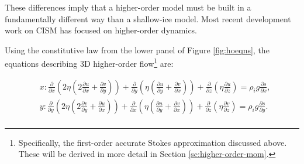 These differences imply that a higher-order model must be built in a fundamentally different way than a shallow-ice model.
Most recent development work on CISM has focused on higher-order dynamics.

%
%
%

Using the constitutive law from the lower panel of Figure \ref{fig:hoeqns}, the equations describing 3D higher-order flow\footnote{Specifically, the first-order accurate Stokes approximation discussed above. These will be derived in more detail in Section \ref{sc:higher-order-mom}.} are:

\begin{equation}
  \begin{split}
  & x: \frac{\partial}{\partial x}\left ( 2 \eta  
\left(2\frac{\partial u}{\partial x}+\frac{\partial v}{\partial y}\right)\right)
+\frac{\partial}{\partial y}\left(\eta \left(
\frac{\partial u}{\partial y}+\frac{\partial v}{\partial x}\right)\right)
+\frac{\partial}{\partial z}\left(\eta \frac{\partial u}{\partial z}\right)
=\rho_i g \frac{\partial s}{\partial x}, \\
  & y: \frac{\partial}{\partial y}\left ( 2 \eta 
\left(2\frac{\partial v}{\partial y}+\frac{\partial u}{\partial x}\right)\right)
+\frac{\partial}{\partial x}\left(\eta \left(
\frac{\partial u}{\partial y}+\frac{\partial v}{\partial x}\right)\right)
+\frac{\partial}{\partial z}\left(\eta \frac{\partial v}{\partial z}\right)
=\rho_i g \frac{\partial s}{\partial y}. \\
  \end{split}
\end{equation}


